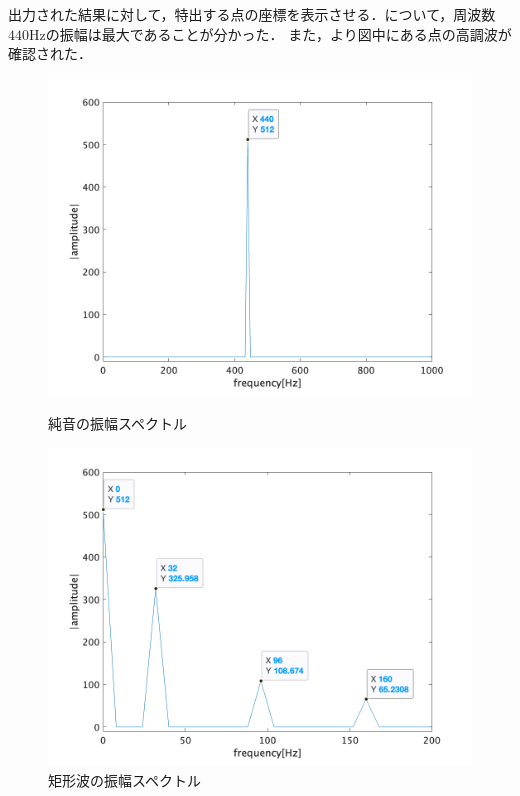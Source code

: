 \result
出力された結果に対して，特出する点の座標を表示させる．について，周波数\(440\textrm{Hz}\)の振幅は最大であることが分かった．
また，より図中にある点の高調波が確認された．
\begin{figure}[h]
    \centering
    \begin{minipage}{.48\textwidth}
        \centering
        \includegraphics[keepaspectratio,width=\textwidth]{../../Figures/02_01.png}
        \caption{純音の振幅スペクトル}
        \label{fig:\kadaiba_純音の振幅スペクトル}
    \end{minipage}
    \begin{minipage}{.48\textwidth}
        \centering
        \includegraphics[keepaspectratio,width=\textwidth]{../../Figures/02_022.png}
        \caption{矩形波の振幅スペクトル}
        \label{fig:\kadaiba_矩形波の振幅スペクトル}
    \end{minipage}
\end{figure}
\consideration
